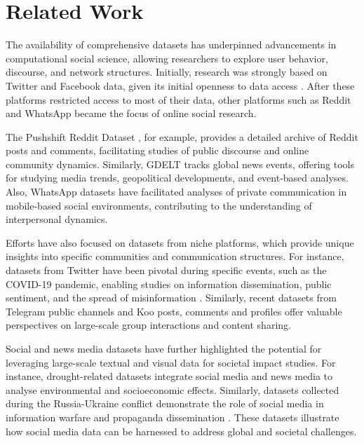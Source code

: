 \section{Related Work}



The availability of comprehensive datasets has underpinned advancements in computational social science, allowing researchers to explore user behavior, discourse, and network structures. Initially, research was strongly based on Twitter and Facebook data, given its initial openness to data access \cite{dooms2013movietweetings,lewis2008tastes}. After these platforms restricted access to most of their data, other platforms such as Reddit and WhatsApp became the focus of online social research. 

The Pushshift Reddit Dataset \cite{baumgartner2020pushshiftredditdataset}, for example, provides a detailed archive of Reddit posts and comments, facilitating studies of public discourse and online community dynamics. Similarly, GDELT \cite{Leetaru13gdelt:global} tracks global news events, offering tools for studying media trends, geopolitical developments, and event-based analyses. Also, WhatsApp datasets \cite{Seufert2023} have facilitated analyses of private communication in mobile-based social environments, contributing to the understanding of interpersonal dynamics.

Efforts have also focused on datasets from niche platforms, which provide unique insights into specific communities and communication structures. For instance, datasets from Twitter have been pivotal during specific events, such as the COVID-19 pandemic, enabling studies on information dissemination, public sentiment, and the spread of misinformation \cite{https://doi.org/10.5281/zenodo.7834392}. Similarly, recent datasets from Telegram public channels \cite{https://doi.org/10.5281/zenodo.7640712} and Koo posts, comments and profiles \cite{koo_Mekacher_Falkenberg_Baronchelli_2024} offer valuable perspectives on large-scale group interactions and content sharing. 

Social and news media datasets have further highlighted the potential for leveraging large-scale textual and visual data for societal impact studies. For instance, drought-related datasets \cite{Shang_Chen_Vora_Zhang_Cai_Wang_2024} integrate social media and news media to analyse environmental and socioeconomic effects. Similarly, datasets collected during the Russia-Ukraine conflict demonstrate the role of social media in information warfare and propaganda dissemination \cite{Ai_Gupta_Oak_Hui_Liu_Hirschberg_2024}. These datasets illustrate how social media data can be harnessed to address global and societal challenges.

